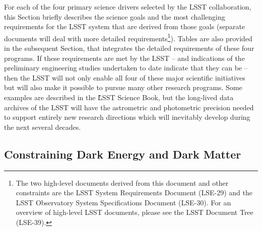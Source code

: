 For each of the four primary science drivers selected by the LSST collaboration,
this Section briefly describes the science goals and the most challenging
requirements for the LSST system that are derived from those goals (separate
documents will deal with more detailed requirements\footnote{The two
high-level documents derived from this document and other constraints are the
LSST System Requirements Document (LSE-29) and the LSST Observatory System
Specifications Document (LSE-30). For an overview of high-level LSST documents,
please see the LSST Document Tree (LSE-39).}).
Tables are also provided in the subsequent Section, that
integrates the detailed requirements of these four programs. If these
requirements are met by the LSST -- and indications of the preliminary
engineering studies undertaken to date indicate that they can be -- then
the LSST will not only enable all four of these major scientific
initiatives but will also make it possible to pursue many other research
programs. Some examples are described in the \G{LSST Science Book},
 but the long-lived
data archives of the LSST will have the astrometric and photometric
precision needed to support entirely new research directions which will
inevitably develop during the next several decades.



\subsection{Constraining Dark Energy and Dark Matter \label{sec:DE}}

